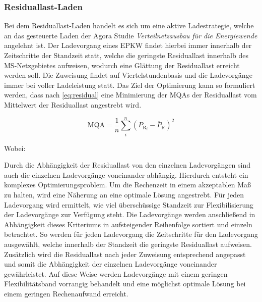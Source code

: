 \subsubsection{Residuallast-Laden}

Bei dem Residuallast-Laden handelt es sich um eine aktive Ladestrategie, welche an das gesteuerte Laden der Agora Studie \textit{Verteilnetzausbau für die Energiewende} \cite{Agora2019} angelehnt ist.
Der Ladevorgang eines \gls{EPKW} findet hierbei immer innerhalb der Zeitschritte der Standzeit statt, welche die geringste Residuallast innerhalb des \gls{MS}-Netzgebietes aufweisen, wodurch eine Glättung der Residuallast erreicht werden soll.
Die Zuweisung findet auf Viertelstundenbasis und die Ladevorgänge immer bei voller Ladeleistung statt.
Das Ziel der Optimierung kann so formuliert werden, dass nach \autoref{eq:residual} eine Minimierung der \glspl{MQA} der Residuallast vom Mittelwert der Residuallast angestrebt wird.

\begin{equation}
	\text{MQA} = \frac{1}{n} \sum_i^n \left( P_{\text{R}_i} - \overline{P}_{\text{R}} \right)^2
	\label{eq:residual}
\end{equation}

\noindent Wobei:


Durch die Abhängigkeit der Residuallast von den einzelnen Ladevorgängen sind auch die einzelnen Ladevorgänge voneinander abhängig.
Hierdurch entsteht ein komplexes Optimierungsproblem.
Um die Rechenzeit in einem akzeptablen Maß zu halten, wird eine Näherung an eine optimale Lösung angestrebt.
Für jeden Ladevorgang wird ermittelt, wie viel überschüssige Standzeit zur Flexibilisierung der Ladevorgänge zur Verfügung steht.
Die Ladevorgänge werden anschließend in Abhängigkeit dieses Kriteriums in aufsteigender Reihenfolge sortiert und einzeln betrachtet.
So werden für jeden Ladevorgang die Zeitschritte für den Ladevorgang ausgewählt, welche innerhalb der Standzeit die geringste Residuallast aufweisen.
Zusätzlich wird die Residuallast nach jeder Zuweisung entsprechend angepasst und somit die Abhängigkeit der einzelnen Ladevorgänge voneinander gewährleistet.
Auf diese Weise werden Ladevorgänge mit einem geringen Flexibilitätsband vorrangig behandelt und eine möglichst optimale Lösung bei einem geringen Rechenaufwand erreicht.



